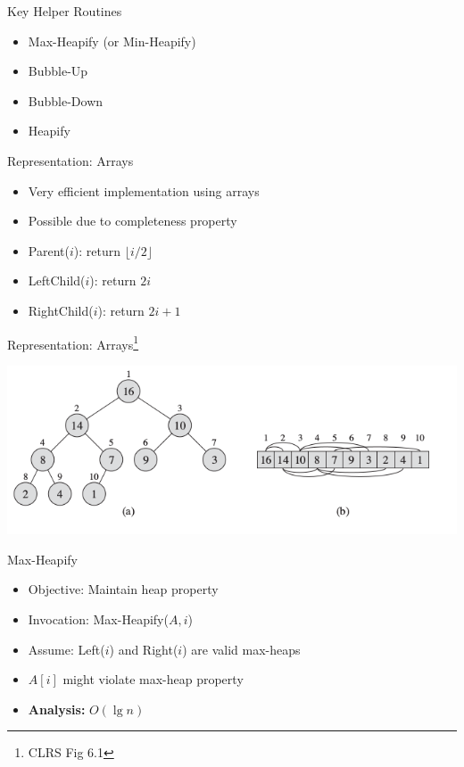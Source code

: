 \documentclass{beamer}
\begin{document}
\begin{frame}{Key Helper Routines}
    \begin{itemize}
        \item Max-Heapify (or Min-Heapify)
        \item Bubble-Up
        \item Bubble-Down
        \item Heapify
    \end{itemize}
\end{frame}

\begin{frame}{Representation: Arrays}
    \begin{itemize}
        \item Very efficient implementation using arrays
        \item Possible due to completeness property
        \item Parent($i$): return $\lfloor i/2 \rfloor$
        \item LeftChild($i$): return $2i$
        \item RightChild($i$): return $2i+1$
    \end{itemize}
\end{frame}

\begin{frame}{Representation: Arrays\footnote{CLRS Fig 6.1}}
    \begin{center}
        \includegraphics[scale=0.4]{maxHeapRepr.png}
    \end{center}
\end{frame}



\begin{frame}{Max-Heapify}
    \begin{itemize}
        \item Objective: Maintain heap property
        \item Invocation: Max-Heapify($A,i$)
        \item Assume: Left($i$) and Right($i$) are valid max-heaps
        \item $A[i]$ might violate max-heap property
        \item {\bf Analysis:} $O(\lg n)$
    \end{itemize}
\end{frame}
\end{document}

